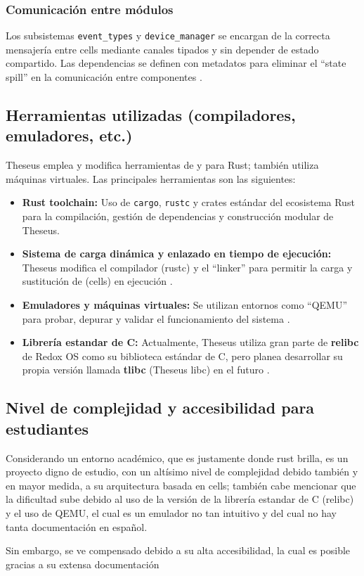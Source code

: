 \subsubsection*{Comunicación entre módulos}
Los subsistemas \texttt{event\_types} y \texttt{device\_manager} se encargan de la correcta mensajería entre cells mediante canales tipados y sin depender de estado compartido. Las dependencias se definen con metadatos para eliminar el “state spill” en la comunicación entre componentes \citep{boos2017theseus}.

\subsection{Herramientas utilizadas (compiladores, emuladores, etc.)}
Theseus emplea y modifica herramientas de y para Rust; también utiliza máquinas virtuales. Las principales herramientas son las siguientes:
\begin{itemize}
    \item \textbf{Rust toolchain:} Uso de \texttt{cargo}, \texttt{rustc} y crates estándar del ecosistema Rust para la compilación, gestión de dependencias y construcción modular de Theseus.
    \item \textbf{Sistema de carga dinámica y enlazado en tiempo de ejecución:} Theseus modifica el compilador (rustc) y el “linker” para permitir la carga y sustitución de (cells) en ejecución \citep{boos2017theseus}.
    \item \textbf{Emuladores y máquinas virtuales:} Se utilizan entornos como “QEMU” para probar, depurar y validar el funcionamiento del sistema \citep{theseus_GitHub}.
    \item \textbf{Librería estandar de C:} Actualmente, Theseus utiliza gran parte de \textbf{relibc} de Redox OS como su biblioteca estándar de C, pero planea desarrollar su propia versión llamada \textbf{tlibc} (Theseus libc) en el futuro \citep{theseus_GitHub}.
\end{itemize}

\subsection{Nivel de complejidad y accesibilidad para estudiantes}
Considerando un entorno académico, que es justamente donde rust brilla, es un proyecto digno de estudio,
con un altísimo nivel de complejidad debido también y en mayor medida, a su arquitectura basada en cells; también cabe mencionar que
la dificultad sube debido al uso de la versión de la librería estandar de C (relibc) y el uso de QEMU, el cual es un emulador no tan intuitivo y del cual no hay tanta documentación en español.

Sin embargo, se ve compensado debido a su alta accesibilidad, la cual es posible gracias a su extensa documentación 